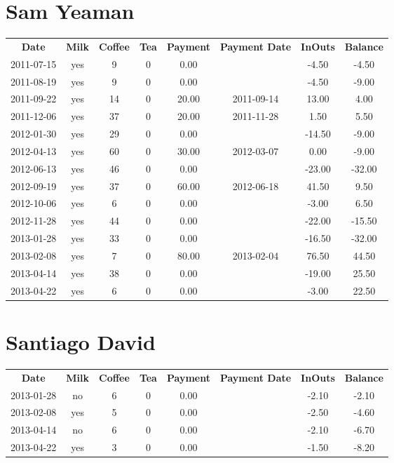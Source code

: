 \section{Sam Yeaman}

\begin{center}
\begin{tabular}{cccccccc}
\textbf{Date} & \textbf{Milk} & \textbf{Coffee} & \textbf{Tea} & \textbf{Payment} & \textbf{Payment Date} & \textbf{InOuts} & \textbf{Balance} \\
2011-07-15 & yes &  9 & 0 &  0.00 &  &  -4.50 &  -4.50\\ 
2011-08-19 & yes &  9 & 0 &  0.00 &  &  -4.50 &  -9.00\\ 
2011-09-22 & yes & 14 & 0 & 20.00 & 2011-09-14 &  13.00 &   4.00\\ 
2011-12-06 & yes & 37 & 0 & 20.00 & 2011-11-28 &   1.50 &   5.50\\ 
2012-01-30 & yes & 29 & 0 &  0.00 &  & -14.50 &  -9.00\\ 
2012-04-13 & yes & 60 & 0 & 30.00 & 2012-03-07 &   0.00 &  -9.00\\ 
2012-06-13 & yes & 46 & 0 &  0.00 &  & -23.00 & -32.00\\ 
2012-09-19 & yes & 37 & 0 & 60.00 & 2012-06-18 &  41.50 &   9.50\\ 
2012-10-06 & yes &  6 & 0 &  0.00 &  &  -3.00 &   6.50\\ 
2012-11-28 & yes & 44 & 0 &  0.00 &  & -22.00 & -15.50\\ 
2013-01-28 & yes & 33 & 0 &  0.00 &  & -16.50 & -32.00\\ 
2013-02-08 & yes &  7 & 0 & 80.00 & 2013-02-04 &  76.50 &  44.50\\ 
2013-04-14 & yes & 38 & 0 &  0.00 &  & -19.00 &  25.50\\ 
2013-04-22 & yes &  6 & 0 &  0.00 &  &  -3.00 &  22.50
\end{tabular}
\end{center}

\section{Santiago David}

\begin{center}
\begin{tabular}{cccccccc}
\textbf{Date} & \textbf{Milk} & \textbf{Coffee} & \textbf{Tea} & \textbf{Payment} & \textbf{Payment Date} & \textbf{InOuts} & \textbf{Balance} \\
2013-01-28 & no & 6 & 0 & 0.00 &  & -2.10 & -2.10\\ 
2013-02-08 & yes & 5 & 0 & 0.00 &  & -2.50 & -4.60\\ 
2013-04-14 & no & 6 & 0 & 0.00 &  & -2.10 & -6.70\\ 
2013-04-22 & yes & 3 & 0 & 0.00 &  & -1.50 & -8.20
\end{tabular}
\end{center}

